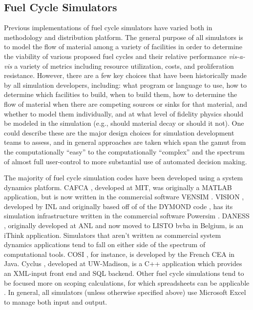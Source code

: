 \subsection{Fuel Cycle Simulators}

Previous implementations of fuel cycle simulators have varied both in
methodology and distribution platform. The general purpose of all simulators is
to model the flow of material among a variety of facilities in order to
determine the viability of various proposed fuel cycles and their relative
performance \textit{vis-a-vis} a variety of metrics including resource
utilization, costs, and proliferation resistance. However, there are a few key
choices that have been historically made by all simulation developers,
including: what program or language to use, how to determine which facilities to
build, when to build them, how to determine the flow of material when there are
competing sources or sinks for that material, and whether to model them
individually, and at what level of fidelity physics should be modeled in the
simulation (e.g., should material decay or should it not). One could describe
these are the major design choices for simulation development teams to assess,
and in general approaches are taken which span the gamut from the
computationally ``easy'' to the computationally ``complex'' and the spectrum of
almost full user-control to more substantial use of automated decision making.

The majority of fuel cycle simulation codes have been developed using a system
dynamics platform. CAFCA \cite{guerin_impact_2009}, developed at MIT, was
originally a MATLAB application, but is now written in the commercial software
VENSIM \cite{vensim_2010_ventana}. VISION \cite{jacobson_verifiable_2010},
developed by INL and originally based off of of the DYMOND
code \cite{moisseytsev_dymond_2001}, has its simulation infrastructure written
in the commercial software Powersim \cite{studio_powersim_2003}.
DANESS \cite{van_den_durpel_daness_2009}, originally developed at ANL and now
moved to LISTO bvba in Belgium, is an iThink \cite{richmond_ithink_2004}
application. Simulators that aren't written as commercial system dynamics
applications tend to fall on either side of the spectrum of computational
tools. COSI \cite{boucher_cosi_2005}, for instance, is developed by the French
CEA in Java. Cyclus \cite{cyclus2012}, developed at UW-Madison, is a C++
application which provides an XML-input front end and SQL backend. Other fuel
cycle simulations tend to be focused more on scoping calculations, for which
spreadsheets can be applicable \cite{brudieu_evaluation_2011}. In general, all
simulators (unless otherwise specified above) use Microsoft Excel to manage both
input and output.

